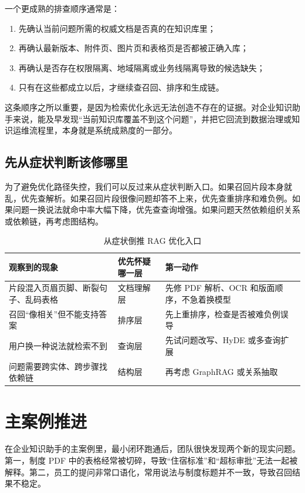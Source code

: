 一个更成熟的排查顺序通常是：
\begin{enumerate}
  \item 先确认当前问题所需的权威文档是否真的在知识库里；
  \item 再确认最新版本、附件页、图片页和表格页是否都被正确入库；
  \item 再确认是否存在权限隔离、地域隔离或业务线隔离导致的候选缺失；
  \item 只有在这些都成立以后，才继续查召回、排序和生成链。
\end{enumerate}

这条顺序之所以重要，是因为检索优化永远无法创造不存在的证据。对企业知识助手来说，能及早发现“当前知识库覆盖不到这个问题”，并把它回流到数据治理或知识运维流程里，本身就是系统成熟度的一部分。

\subsection{先从症状判断该修哪里}
为了避免优化路径失控，我们可以反过来从症状判断入口。如果召回片段本身就乱，优先查解析。如果召回片段很像问题却答不上来，优先查重排序和难负例。如果问题一换说法就命中率大幅下降，优先查查询增强。如果问题天然依赖组织关系或依赖链，再考虑图结构。

\begin{table}[H]
\centering
\small
\begin{tabularx}{\textwidth}{>{\raggedright\arraybackslash}p{3.1cm}>{\raggedright\arraybackslash}p{3.2cm}>{\raggedright\arraybackslash}X}
\toprule
\textbf{观察到的现象} & \textbf{优先怀疑哪一层} & \textbf{第一动作} \\
\midrule
片段混入页眉页脚、断裂句子、乱码表格 & 文档理解层 & 先修 PDF 解析、OCR 和版面顺序，不急着换模型 \\
召回“像相关”但不能支持答案 & 排序层 & 先上重排序，检查是否被难负例误导 \\
用户换一种说法就检索不到 & 查询层 & 先试问题改写、HyDE 或多查询扩展 \\
问题需要跨实体、跨步骤找依赖链 & 结构层 & 再考虑 GraphRAG 或关系抽取 \\
\bottomrule
\end{tabularx}
\caption{从症状倒推 RAG 优化入口}
\label{tab:rag-symptom-routing}
\end{table}

\section{主案例推进}
在企业知识助手的主案例里，最小闭环跑通后，团队很快发现两个新的现实问题。第一，制度 PDF 中的表格经常被切碎，导致“住宿标准”和“超标审批”无法一起被解释。第二，员工的提问非常口语化，常用说法与制度标题并不一致，导致召回结果不稳定。

